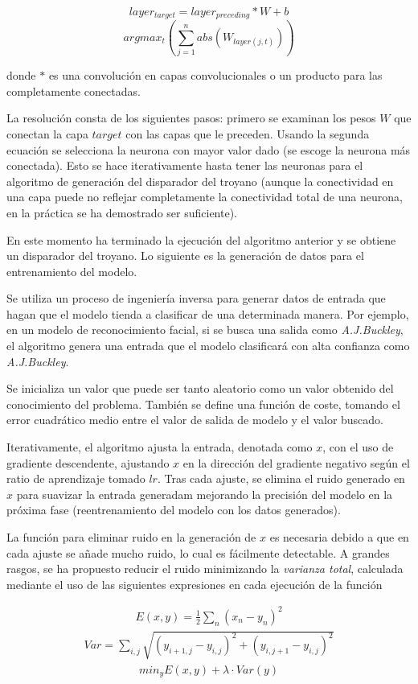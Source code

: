 $$layer_{target} = layer_{preceding} * W + b$$
$$argmax_{t} \left( \sum_{j=1}^n abs(W_{layer(j,t)})\right)$$

donde $*$ es una convolución en capas convolucionales o un producto para las completamente conectadas.

La resolución consta de los siguientes pasos: primero se examinan los pesos $W$ que conectan la capa $target$ con las capas que le preceden. Usando la segunda ecuación se selecciona la neurona con mayor valor dado (se escoge la neurona más conectada). Esto se hace iterativamente hasta tener las neuronas para el algoritmo de generación del disparador del troyano (aunque la conectividad en una capa puede no reflejar completamente la conectividad total de una neurona, en la práctica se ha demostrado ser suficiente).

En este momento ha terminado la ejecución del algoritmo anterior y se obtiene un disparador del troyano. Lo siguiente es la generación de datos para el entrenamiento del modelo.

Se utiliza un proceso de ingeniería inversa para generar datos de entrada que hagan que el modelo tienda a clasificar de una determinada manera. Por ejemplo, en un modelo de reconocimiento facial, si se busca una salida como \textit{A.J.Buckley}, el algoritmo genera una entrada que el modelo clasificará con alta confianza como \textit{A.J.Buckley}.

Se inicializa un valor que puede ser tanto aleatorio como un valor obtenido del conocimiento del problema. También se define una función de coste, tomando el error cuadrático medio entre el valor de salida de modelo y el valor buscado.

Iterativamente, el algoritmo ajusta la entrada, denotada como $x$, con el uso de gradiente descendente, ajustando $x$ en la dirección del gradiente negativo según el ratio de aprendizaje tomado $lr$. Tras cada ajuste, se elimina el ruido generado en $x$ para suavizar la entrada generadam mejorando la precisión del modelo en la próxima fase (reentrenamiento del modelo con los datos generados).

La función para eliminar ruido en la generación de $x$ es necesaria debido a que en cada ajuste se añade mucho ruido, lo cual es fácilmente detectable. A grandes rasgos, se ha propuesto reducir el ruido minimizando la \textit{varianza total}, calculada mediante el uso de las siguientes expresiones en cada ejecución de la función

\begin{align}
E(x,y) = \frac{1}{2} \sum_{n} (x_n - y_n)^2
\label{eq:troyano1}
\end{align}
\begin{align}
Var = \sum_{i,j} \sqrt{(y_{i+1,j} - y_{i,j})^2 + (y_{i,j+1} - y_{i,j})^2}
\label{eq:troyano2}
\end{align}
\begin{align}
min_{y} E(x,y) + \lambda \cdot Var(y)
\label{eq:troyano3}
\end{align}

